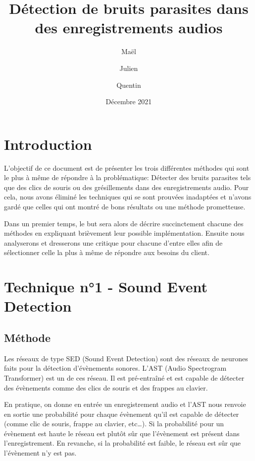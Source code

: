 \documentclass{article}
\title{Détection de bruits parasites dans des enregistrements audios}
\author{Maël \bsc{Alet} \and Julien \bsc{Alonzo} \and Quentin \bsc{Saint-Guily}}
\date{Décembre 2021}
\begin{document}
\maketitle
\tableofcontents

\begin{license}
    
    
\end{license}

\newpage

\section{Introduction}

L'objectif de ce document est de présenter les trois différentes méthodes qui sont le plus à même de répondre à la problématique: Détecter des bruits parasites tels que des clics de souris ou des grésillements dans des enregistrements audio. Pour cela, nous avons éliminé les techniques qui se sont prouvées inadaptées et n'avons gardé que celles qui ont montré de bons résultats ou une méthode prometteuse.

Dans un premier temps, le but sera alors de décrire succinctement chacune des méthodes en expliquant brièvement leur possible implémentation. 
Ensuite nous analyserons et dresserons une critique pour chacune d'entre elles afin de sélectionner celle la plus à même de répondre aux besoins du client.


\section{Technique n°1 - Sound Event Detection}

\subsection{Méthode}

Les réseaux de type SED (Sound Event Detection) sont des réseaux de neurones faits pour la détection d'évènements sonores. L'AST (Audio Spectrogram Transformer) est un de ces réseau. Il est pré-entraîné et est capable de détecter des évènements comme des clics de souris et des frappes au clavier.

En pratique, on donne en entrée un enregistrement audio et l'AST nous renvoie en sortie une probabilité pour chaque évènement qu'il est capable de détecter (comme \og clic de souris\fg, \og frappe au clavier\fg, etc\ldots). Si la probabilité pour un évènement est haute le réseau est plutôt sûr que l'évènement est présent dans l'enregistrement. En revanche, si la probabilité est faible, le réseau est sûr que l'évènement n'y est pas.
\end{document}
